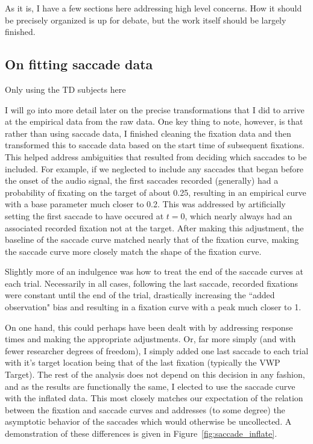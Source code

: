 \documentclass{article}
\begin{document}
As it is, I have a few sections here addressing high level concerns. How it should be precisely organized is up for debate, but the work itself should be largely finished.


\subsection{On fitting saccade data}

Only using the TD subjects here

I will go into more detail later on the precise transformations that I did to arrive at the empirical data from the raw data.  One key thing to note, however, is that rather than using saccade data, I finished cleaning the fixation data and then transformed this to saccade data based on the start time of subsequent fixations. This helped address ambiguities that resulted from deciding which saccades to be included. For example, if we neglected to include any saccades that began before the onset of the audio signal, the first saccades recorded (generally) had a probability of fixating on the target of about 0.25, resulting in an empirical curve with a base parameter much closer to 0.2. This was addressed by artificially setting the first saccade to have occured at $t = 0$, which nearly always had an associated recorded fixation not at the target. After making this adjustment, the baseline of the saccade  curve matched nearly that of the fixation curve, making the saccade curve more closely match the shape of the fixation curve.

Slightly more of an indulgence was how to treat the end of the saccade curves at each trial. Necessarily in all cases, following the last saccade, recorded fixations were constant until the end of the trial, drastically increasing the ``added observation" bias and resulting in a fixation curve with a peak much closer to 1.

On one hand, this could perhaps have been dealt with by addressing response times and making the appropriate adjustments. Or, far more simply (and with fewer researcher degrees of freedom), I simply added one last saccade to each trial with it's target location being that of the last fixation (typically the VWP Target). The rest of the analysis does not depend on this decision in any fashion, and as the results are functionally the same, I elected to use the saccade curve with the inflated data. This most closely matches our expectation of the relation between the fixation and saccade curves and addresses (to some degree) the asymptotic behavior of the saccades which would otherwise be uncollected. A demonstration of these differences is given in Figure~\ref{fig:saccade_inflate}.
\end{document}

